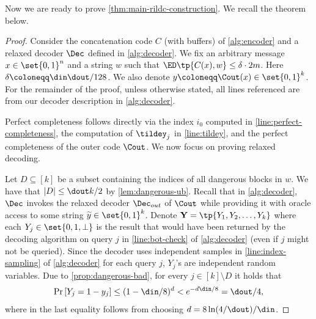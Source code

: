 Now we are ready to prove \cref{thm:main-rildc-construction}. We recall the theorem below.
\weakirldcmain*
\begin{proof}
	Consider the concatenation code $C$ (with buffers) of \cref{alg:encoder} and a relaxed decoder $\Dec$ defined in \cref{alg:decoder}. 
	We fix an arbitrary message $x \in \set{0,1}^n$ and a string $w$ such that $\ED\tp{C(x), w}\le \delta \cdot 2m$. 
	Here $\delta \coloneqq \din\dout/128$. 
	We also denote $y \coloneqq \Cout(x) \in \set{0,1}^k$.
	For the remainder of the proof, unless otherwise stated, all lines referenced are from our decoder description in \cref{alg:decoder}.
	
	Perfect completeness follows directly via the index $i_0$ computed in \cref{line:perfect-completeness}, the computation of $\tildey_j$ in \cref{line:tildey}, and the perfect completeness of the outer code $\Cout$.
	We now focus on proving relaxed decoding.
	
	Let $D \subseteq [k]$ be a subset containing the indices of all dangerous blocks in $w$. We have that $|D|\le \dout k/2$ by \cref{lem:dangerous-ub}.
	Recall that in \cref{alg:decoder}, $\Dec$ invokes the relaxed decoder $\Dec_{out}$ of $\Cout$ while providing it with oracle access to some string $\widetilde{y} \in \set{0,1}^k$. 
	Denote $\mathbf{Y}=\tp{Y_1,Y_2,\dots,Y_k}$ where each $Y_j \in \set{0,1,\perp}$ is the result that would have been returned by the decoding algorithm on query $j$ in \cref{line:bot-check} of \cref{alg:decoder} (even if $j$ might not be queried). 
	Since the decoder uses independent samples in \cref{line:index-sampling} of \cref{alg:decoder} for each query $j$, $Y_j$'s are independent random variables. 
	Due to \cref{prop:dangerous-bad}, for every $j \in [k]\setminus D$ it holds that
	\begin{align*}
		\Pr\left[ Y_j = 1-y_j \right] \le (1-\din/8)^d < e^{-d\din/8} = \dout/4, 
	\end{align*}
	where in the last equality follows from choosing $d = 8\ln(4/\dout)/\din$.
	

\end{proof}
